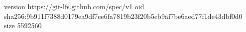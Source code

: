version https://git-lfs.github.com/spec/v1
oid sha256:9b911f7388d0179ea9df7ee6fa7819b23f20b5eb9af7be6aed77f1de43dbf0d0
size 5592560
